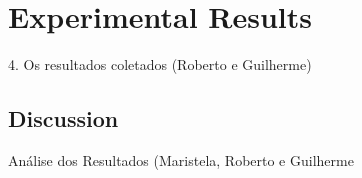 \section{Experimental Results}\label{sec:mining}%

4. Os resultados coletados (Roberto e Guilherme)

\subsection{Discussion}\label{subsec:discussion}%
Análise dos Resultados (Maristela, Roberto e Guilherme